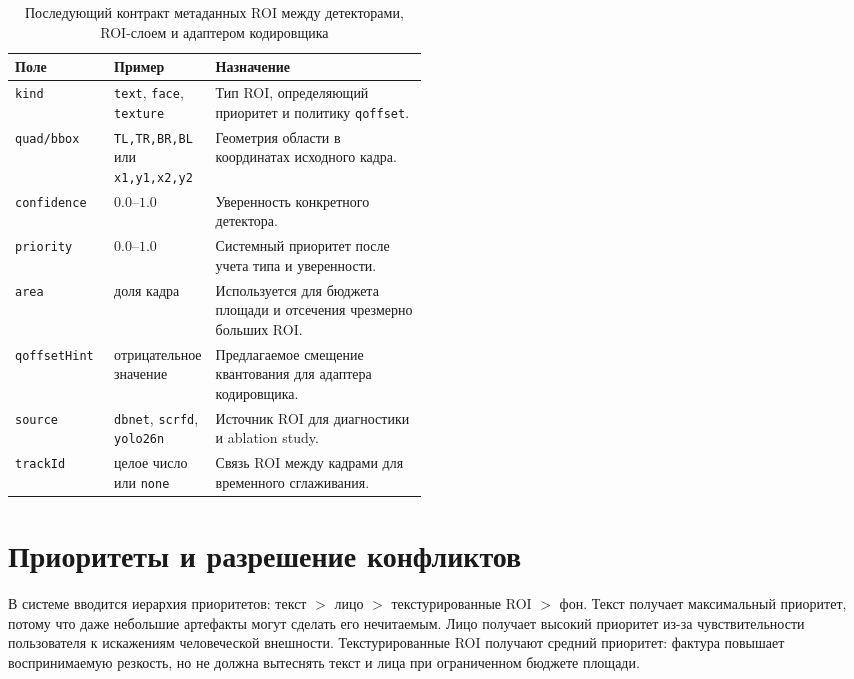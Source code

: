 \documentclass[12pt,a4paper,oneside,openany]{report}
\begin{document}
\begin{table}[!htbp]
  \centering
  \caption{Последующий контракт метаданных ROI между детекторами, ROI-слоем и адаптером
      кодировщика}
  \label{tab:richroi_contract}
  \small
  \begin{tabularx}{\linewidth}{@{}P{0.24\linewidth}P{0.24\linewidth}Y@{}}
    \toprule
    Поле & Пример & Назначение \\
    \midrule
    \texttt{kind} &
    \texttt{text}, \texttt{face}, \texttt{texture} &
    Тип ROI, определяющий приоритет и политику \texttt{qoffset}. \\
    \texttt{quad/bbox} &
    \texttt{TL,TR,BR,BL} или \texttt{x1,y1,x2,y2} &
    Геометрия области в координатах исходного кадра. \\
    \texttt{confidence} & $0.0$--$1.0$ & Уверенность конкретного детектора. \\
    \texttt{priority} & $0.0$--$1.0$ & Системный приоритет после учета типа и уверенности. \\
    \texttt{area} &
    доля кадра &
    Используется для бюджета площади и отсечения чрезмерно больших ROI. \\
    \texttt{qoffsetHint} &
    отрицательное значение &
    Предлагаемое смещение квантования для адаптера кодировщика. \\
    \texttt{source} &
    \texttt{dbnet}, \texttt{scrfd}, \texttt{yolo26n} &
    Источник ROI для диагностики и ablation study. \\
    \texttt{trackId} &
    целое число или \texttt{none} &
    Связь ROI между кадрами для временного сглаживания. \\
    \bottomrule
  \end{tabularx}
\end{table}


\section{Приоритеты и разрешение конфликтов}

В системе вводится иерархия приоритетов: текст $>$ лицо $>$ текстурированные ROI $>$ фон. Текст
получает максимальный приоритет, потому что даже небольшие артефакты могут сделать его
нечитаемым. Лицо получает высокий приоритет из-за чувствительности пользователя к искажениям
человеческой внешности. Текстурированные ROI получают средний приоритет: фактура повышает
воспринимаемую резкость, но не должна вытеснять текст и лица при ограниченном бюджете площади.
\end{document}
